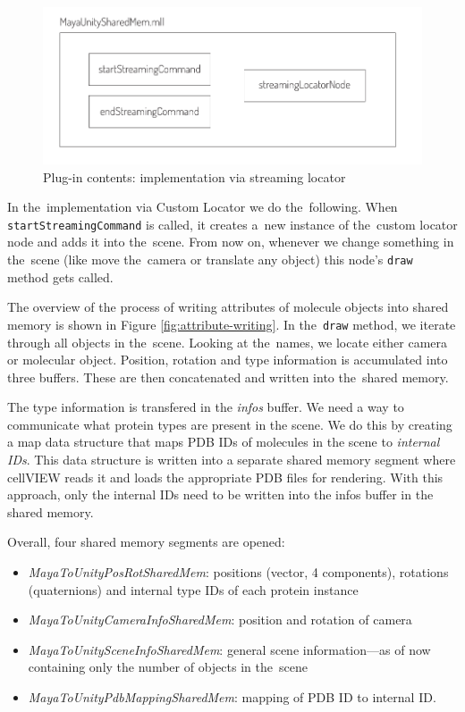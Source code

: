 \documentclass[
  digital, %
  table,   %
  nolof,     %
  nolot,     %
  oneside,
]{fithesis3}
\begin{document}
\begin{figure}
  \centering
  \includegraphics[scale=0.8]{images/plugin-contents.pdf}
  \caption{Plug-in contents: implementation via streaming locator}
  \label{fig:plugin-content}
\end{figure}

In the implementation via Custom Locator we do the following. When \texttt{startStreamingCommand} is called, it creates a new instance of the custom locator node and adds it into the scene. From now on, whenever we change something in the scene (like move the camera or translate any object) this node's \texttt{draw} method gets called.

The overview of the process of writing attributes of molecule objects into shared memory is shown in Figure \ref{fig:attribute-writing}. In the \texttt{draw} method, we iterate through all objects in the scene. Looking at the names, we locate either camera or molecular object. Position, rotation and type information is accumulated into three buffers. These are then concatenated and written into the shared memory.

The type information is transfered in the \textit{infos} buffer. We need a way to communicate what protein types are present in the scene. We do this by creating a map data structure that maps PDB IDs of molecules in the scene to \textit{internal IDs}. This data structure is written into a separate shared memory segment where cellVIEW reads it and loads the appropriate PDB files for rendering. With this approach, only the internal IDs need to be written into the infos buffer in the shared memory.

Overall, four shared memory segments are opened:
\begin{itemize}
\item \textit{MayaToUnityPosRotSharedMem}: positions (vector, 4 components), rotations (quaternions) and internal type IDs of each protein instance
\item \textit{MayaToUnityCameraInfoSharedMem}: position and rotation of camera
\item \textit{MayaToUnitySceneInfoSharedMem}: general scene information—as of now containing only the number of objects in the scene
\item \textit{MayaToUnityPdbMappingSharedMem}: mapping of PDB ID to internal ID.
\end{itemize}
\end{document}
